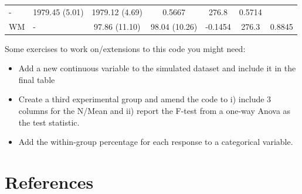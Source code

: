 \documentclass[]{article}
\providecommand{\tightlist}{%
  \setlength{\itemsep}{0pt}\setlength{\parskip}{0pt}}
\theoremstyle{definition}
\theoremstyle{definition}
\theoremstyle{definition}
\theoremstyle{remark}
\begin{document}
\begin{longtable}[]{@{}llccccc@{}}
\begin{minipage}[t]{0.24\columnwidth}
-\strut
\end{minipage} & \begin{minipage}[t]{0.16\columnwidth}\centering\strut
1979.45 (5.01)\strut
\end{minipage} & \begin{minipage}[t]{0.12\columnwidth}\centering\strut
1979.12 (4.69)\strut
\end{minipage} & \begin{minipage}[t]{0.07\columnwidth}\centering\strut
0.5667\strut
\end{minipage} & \begin{minipage}[t]{0.06\columnwidth}\centering\strut
276.8\strut
\end{minipage} & \begin{minipage}[t]{0.06\columnwidth}\centering\strut
0.5714\strut
\end{minipage}\tabularnewline
\begin{minipage}[t]{0.09\columnwidth}\raggedright\strut
WM\strut
\end{minipage} & \begin{minipage}[t]{0.24\columnwidth}\raggedright\strut
-\strut
\end{minipage} & \begin{minipage}[t]{0.16\columnwidth}\centering\strut
97.86 (11.10)\strut
\end{minipage} & \begin{minipage}[t]{0.12\columnwidth}\centering\strut
98.04 (10.26)\strut
\end{minipage} & \begin{minipage}[t]{0.07\columnwidth}\centering\strut
-0.1454\strut
\end{minipage} & \begin{minipage}[t]{0.06\columnwidth}\centering\strut
276.3\strut
\end{minipage} & \begin{minipage}[t]{0.06\columnwidth}\centering\strut
0.8845\strut
\end{minipage}\tabularnewline
\bottomrule
\end{longtable}

Some exercises to work on/extensions to this code you might need:

\begin{itemize}
\tightlist
\item
  Add a new continuous variable to the simulated dataset and include it
  in the final table
\item
  Create a third experimental group and amend the code to i) include 3
  columns for the N/Mean and ii) report the F-test from a one-way Anova
  as the test statistic.
\item
  Add the within-group percentage for each response to a categorical
  variable.
\end{itemize}

\section*{References}\label{references}


\end{document}
